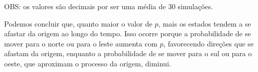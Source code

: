 \begin{enumerate}
\begin{resposta}
\begin{center}
        \small
        OBS: os valores são decimais por ser uma média de 30 simulações.
\end{center}

    Podemos concluir que, quanto maior o valor de $p$, mais os estados tendem a se afastar da origem ao longo do tempo. Isso ocorre porque a probabilidade de se mover para o norte ou para o leste aumenta com $p$, favorecendo direções que se afastam da origem, enquanto a probabilidade de se mover para o sul ou para o oeste, que aproximam o processo da origem, diminui.

    \end{resposta}
\end{enumerate}